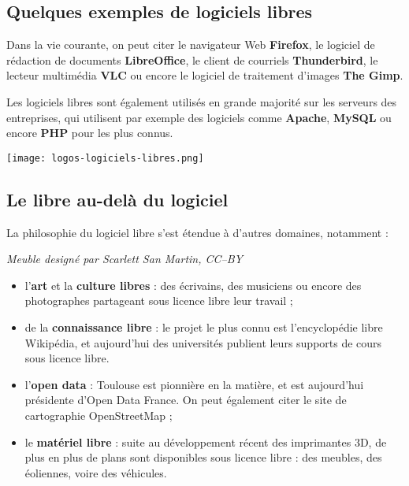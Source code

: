 \subsection{Quelques exemples de logiciels libres}

\begin{minipage}{0.7\textwidth}
Dans la vie courante, on peut citer le navigateur Web \textbf{Firefox}, 
le logiciel de rédaction de documents \textbf{LibreOffice}, le 
client de courriels \textbf{Thunderbird}, le lecteur 
multimédia \textbf{VLC} ou encore le logiciel de traitement 
d’images \textbf{The Gimp}.

\Separateur

Les logiciels libres sont également utilisés en grande majorité sur 
les serveurs des entreprises, qui utilisent par exemple des 
logiciels comme \textbf{Apache}, \textbf{MySQL} ou 
encore \textbf{PHP} pour les plus connus.
\end{minipage}
\begin{minipage}{0.3\textwidth}
\begin{center}
\texttt{[image: logos-logiciels-libres.png]}
\end{center}
\end{minipage}

\subsection{Le libre au-delà du logiciel}

La philosophie du logiciel libre s’est étendue à d’autres domaines,
 notamment :

\begin{minipage}{0.3\textwidth}
\begin{center}
\textit{Meuble designé par Scarlett San Martin, CC--BY}
\end{center}
\end{minipage}
\begin{minipage}{0.7\textwidth}
\begin{itemize}[label=$\bullet$]
\item l'\textbf{art} et la \textbf{culture libres} : 
des écrivains, des musiciens 
ou encore des photographes partageant sous licence libre leur travail ;
\item de la \textbf{connaissance libre} : le projet le plus connu est 
l’encyclopédie libre Wikipédia, et aujourd'hui des universités 
publient leurs supports de cours sous licence libre. 
\item l'\textbf{open data} : Toulouse est pionnière en la matière, 
et est aujourd'hui présidente d’Open Data France. On peut également 
citer le site de cartographie \mbox{OpenStreetMap} ;
\item le \textbf{matériel libre} : suite au développement 
récent des imprimantes 3D, de plus en plus de plans sont disponibles
 sous licence libre : des meubles, des éoliennes, voire des véhicules.
\end{itemize}
\end{minipage}


